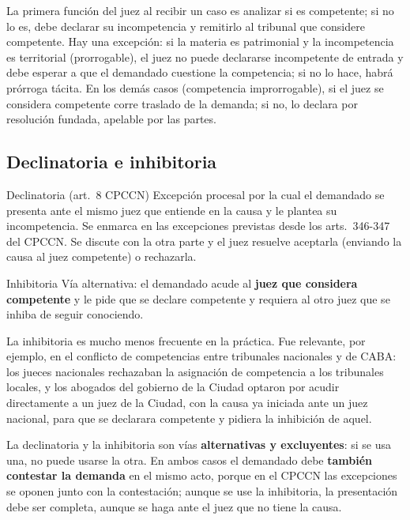 \documentclass[12pt,oneside]{book}
\begin{document}
La primera función del juez al recibir un caso es analizar si es competente; si no lo es, debe declarar su incompetencia y remitirlo al tribunal que considere competente. Hay una excepción: si la materia es patrimonial y la incompetencia es territorial (prorrogable), el juez no puede declararse incompetente de entrada y debe esperar a que el demandado cuestione la competencia; si no lo hace, habrá prórroga tácita. En los demás casos (competencia improrrogable), si el juez se considera competente corre traslado de la demanda; si no, lo declara por resolución fundada, apelable por las partes.

\subsection{Declinatoria e inhibitoria}

\begin{definicion}{Declinatoria (art.~8 CPCCN)}
Excepción procesal por la cual el demandado se presenta ante el mismo juez que entiende en la causa y le plantea su incompetencia. Se enmarca en las excepciones previstas desde los arts.~346-347 del CPCCN. Se discute con la otra parte y el juez resuelve aceptarla (enviando la causa al juez competente) o rechazarla.
\end{definicion}

\begin{definicion}{Inhibitoria}
Vía alternativa: el demandado acude al \textbf{juez que considera competente} y le pide que se declare competente y requiera al otro juez que se inhiba de seguir conociendo.
\end{definicion}

La inhibitoria es mucho menos frecuente en la práctica. Fue relevante, por ejemplo, en el conflicto de competencias entre tribunales nacionales y de CABA: los jueces nacionales rechazaban la asignación de competencia a los tribunales locales, y los abogados del gobierno de la Ciudad optaron por acudir directamente a un juez de la Ciudad, con la causa ya iniciada ante un juez nacional, para que se declarara competente y pidiera la inhibición de aquel.

\begin{importante}
La declinatoria y la inhibitoria son vías \textbf{alternativas y excluyentes}: si se usa una, no puede usarse la otra. En ambos casos el demandado debe \textbf{también contestar la demanda} en el mismo acto, porque en el CPCCN las excepciones se oponen junto con la contestación; aunque se use la inhibitoria, la presentación debe ser completa, aunque se haga ante el juez que no tiene la causa.
\end{importante}
\end{document}
